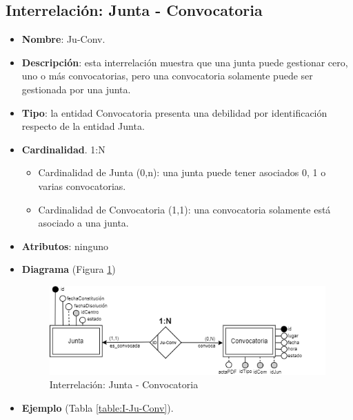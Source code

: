 \subsection{Interrelación: Junta - Convocatoria}
\begin{itemize}
    \item \textbf{Nombre}: Ju-Conv.
    \item \textbf{Descripción}: esta interrelación muestra que una junta puede gestionar cero, uno o más convocatorias, pero una convocatoria solamente puede ser gestionada por una junta.
    \item \textbf{Tipo}: la entidad Convocatoria presenta una debilidad por identificación respecto de la entidad Junta.
    \item \textbf{Cardinalidad}. 1:N
    \begin{itemize}
        \item Cardinalidad de Junta (0,n): una junta puede tener asociados 0, 1 o varias convocatorias.
        \item Cardinalidad de Convocatoria (1,1): una convocatoria solamente está asociado a una junta.
    \end{itemize}
    \item \textbf{Atributos}: ninguno
    \item \textbf{Diagrama} (Figura \ref{fig:I-Ju-Conv}) 
    \begin{figure}[H]
        \centering
        \includegraphics[scale=0.7]{img/diagramas/EER/I-Ju-Conv}
        \caption{Interrelación: Junta - Convocatoria}
        \label{fig:I-Ju-Conv}
    \end{figure}
    
    \item \textbf{Ejemplo} (Tabla \ref{table:I-Ju-Conv}).


\end{itemize}
